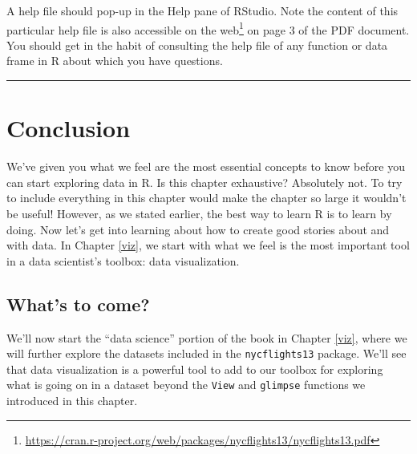 \documentclass[12pt,]{krantz}
\renewcommand{\href}[2]{#2\footnote{\url{#1}}}
\begin{document}
A help file should pop-up in the Help pane of RStudio. Note the content
of this particular help file is also accessible on the
\href{https://cran.r-project.org/web/packages/nycflights13/nycflights13.pdf}{web}
on page 3 of the PDF document. You should get in the habit of consulting
the help file of any function or data frame in R about which you have
questions.

\begin{center}\rule{0.5\linewidth}{\linethickness}\end{center}

\section{Conclusion}\label{conclusion}

We've given you what we feel are the most essential concepts to know
before you can start exploring data in R. Is this chapter exhaustive?
Absolutely not. To try to include everything in this chapter would make
the chapter so large it wouldn't be useful! However, as we stated
earlier, the best way to learn R is to learn by doing. Now let's get
into learning about how to create good stories about and with data. In
Chapter \ref{viz}, we start with what we feel is the most important tool
in a data scientist's toolbox: data visualization.

\subsection{What's to come?}\label{whats-to-come}

We'll now start the ``data science'' portion of the book in Chapter
\ref{viz}, where we will further explore the datasets included in the
\texttt{nycflights13} package. We'll see that data visualization is a
powerful tool to add to our toolbox for exploring what is going on in a
dataset beyond the \texttt{View} and \texttt{glimpse} functions we
introduced in this chapter.
\end{document}
